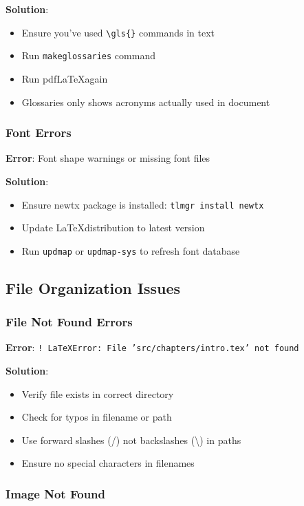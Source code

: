\textbf{Solution}:
\begin{itemize}
    \item Ensure you've used \texttt{\textbackslash gls\{\}} commands in text
    \item Run \texttt{makeglossaries} command
    \item Run pdf\LaTeX again
    \item Glossaries only shows acronyms actually used in document
\end{itemize}

\subsubsection*{Font Errors}

\textbf{Error}: Font shape warnings or missing font files

\textbf{Solution}:
\begin{itemize}
    \item Ensure newtx package is installed: \texttt{tlmgr install newtx}
    \item Update \LaTeX distribution to latest version
    \item Run \texttt{updmap} or \texttt{updmap-sys} to refresh font database
\end{itemize}

\subsection*{File Organization Issues}

\subsubsection*{File Not Found Errors}

\textbf{Error}: \texttt{! \LaTeX Error: File 'src/chapters/intro.tex' not found}

\textbf{Solution}:
\begin{itemize}
    \item Verify file exists in correct directory
    \item Check for typos in filename or path
    \item Use forward slashes (/) not backslashes (\textbackslash) in paths
    \item Ensure no special characters in filenames
\end{itemize}

\subsubsection*{Image Not Found}

